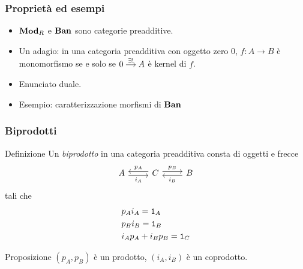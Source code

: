 \documentclass{beamer}
\begin{document}
\begin{frame}[fragile]
  \frametitle{Proprietà ed esempi}
  \begin{itemize}
  \item \(\mathbf{Mod}_R\) e \(\mathbf{Ban}\) sono categorie preadditive.
  \item Un adagio: in una categoria preadditiva con oggetto zero \(0\),
    \(f : A \to B\) è monomorfismo se e solo se
    \(\begin{tikzcd}[column sep=small, cramped] 0 \ar["{\exists!}", r] &
      A \end{tikzcd}\) è kernel di \(f\).
  \item Enunciato duale.
  \item Esempio: caratterizzazione morfismi di \(\mathbf{Ban}\)
  \end{itemize}

\end{frame}

\begin{frame}[fragile]
  \frametitle{Biprodotti}
  
  \begin{block}{Definizione}
    Un {\em biprodotto} in una categoria preadditiva consta di oggetti e
    frecce
    \[
      \begin{tikzcd}
        A \ar["{i_A}", r, shift right, swap] & C \ar["{p_A}", l, shift
        right, swap] \ar["{p_B}", r, shift left] & B \ar["{i_B}", l,
        shift left]
      \end{tikzcd}
    \]
    tali che
    \begin{align}
      & p_A i_A = \mathtt 1_A \label{eqn:Biprod1} \\
      & p_B i_B = \mathtt 1_B \label{eqn:Biprod2}\\
      & i_A p_A + i_B p_B = \mathtt 1_C \label{eqn:Biprod3}
    \end{align}
  \end{block}

  \begin{block}{Proposizione}
    \((p_A, p_B)\) è un prodotto, \((i_A, i_B)\) è un coprodotto.
  \end{block}
  
\end{frame}
\end{document}
